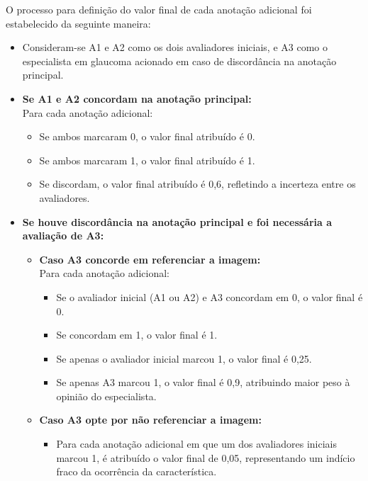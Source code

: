 \documentclass[12pt]{article}
\begin{document}
O processo para definição do valor final de cada anotação adicional foi estabelecido da seguinte maneira:
\begin{itemize}[noitemsep]
    \item Consideram-se A1 e A2 como os dois avaliadores iniciais, e A3 como o especialista em glaucoma acionado em caso de discordância na anotação principal.
    
    \item \textbf{Se A1 e A2 concordam na anotação principal:}\\
    Para cada anotação adicional:
    \begin{itemize}[noitemsep]
        \item Se ambos marcaram 0, o valor final atribuído é 0.
        \item Se ambos marcaram 1, o valor final atribuído é 1.
        \item Se discordam, o valor final atribuído é 0,6, refletindo a incerteza entre os avaliadores.
    \end{itemize}

    \item \textbf{Se houve discordância na anotação principal e foi necessária a avaliação de A3:}
    \begin{itemize}[noitemsep]
        \item \textbf{Caso A3 concorde em referenciar a imagem:}\\
        Para cada anotação adicional:
        \begin{itemize}[noitemsep]
            \item Se o avaliador inicial (A1 ou A2) e A3 concordam em 0, o valor final é 0.
            \item Se concordam em 1, o valor final é 1.
            \item Se apenas o avaliador inicial marcou 1, o valor final é 0,25.
            \item Se apenas A3 marcou 1, o valor final é 0,9, atribuindo maior peso à opinião do especialista.
        \end{itemize}

        \item \textbf{Caso A3 opte por não referenciar a imagem:}
        \begin{itemize}[noitemsep]
            \item Para cada anotação adicional em que um dos avaliadores iniciais marcou 1, é atribuído o valor final de 0,05, representando um indício fraco da ocorrência da característica.
        \end{itemize}
    \end{itemize}
    

\end{itemize}
\end{document}
